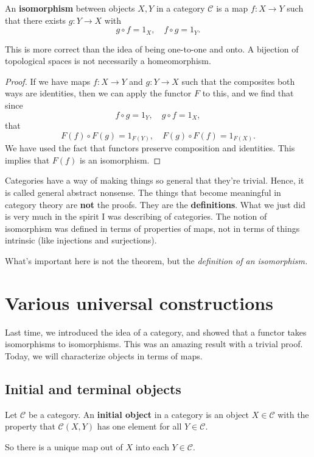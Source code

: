 \begin{definition} 
An \textbf{isomorphism} between objects $X, Y$ in a category $\mathcal{C}$ is a
map $f: X \to Y$ such that there exists $g: Y \to X$ with 
\[ g \circ f = 1_X, \quad f \circ g = 1_Y.  \]
\end{definition} 

This is more correct than the idea of being one-to-one and onto. A bijection of
topological spaces is not necessarily a homeomorphism.


\begin{proof} 
If we have maps $f: X \to Y$ and $g : Y \to X$ such that the composites both
ways are identities, then we can apply the functor $F$ to this, and we find that since
\[ f \circ g = 1_Y, \quad g \circ f = 1_X,   \]
that
\[ F(f) \circ F(g) = 1_{F(Y)}, \quad F(g) \circ F(f) = 1_{F(X)}.  \]
We have used the fact that functors preserve composition and identities. This
implies that $F(f)$ is an isomorphism. 
\end{proof} 

Categories have a way of making things so general that they're trivial. Hence,
it is called general abstract nonsense. The things that become meaningful in
category theory are \textbf{not} the proofs. They are the \textbf{definitions}.
What we just did is very much in the spirit I was describing of categories. The
notion of isomorphism was defined in terms of properties of maps, not in terms
of things intrinsic (like injections and surjections). 

What's important here is not the theorem, but the \emph{definition of an
isomorphism.}



\section{Various universal constructions}

Last time, we introduced the idea of a category, and showed that a functor
takes isomorphisms to isomorphisms.  This was an amazing result with a trivial
proof.  Today, we will characterize objects in terms of maps.
\subsection{Initial and terminal objects}


\begin{definition} 
Let $\mathcal{C}$ be a category. An \textbf{initial object} in a category is an
object $X \in \mathcal{C}$ with the property that $\mathcal{C}(X, Y)$ has one
element for all $Y \in \mathcal{C}$. 

So there is a unique map out of $X$ into each $Y \in \mathcal{C}$. 
\end{definition} 


